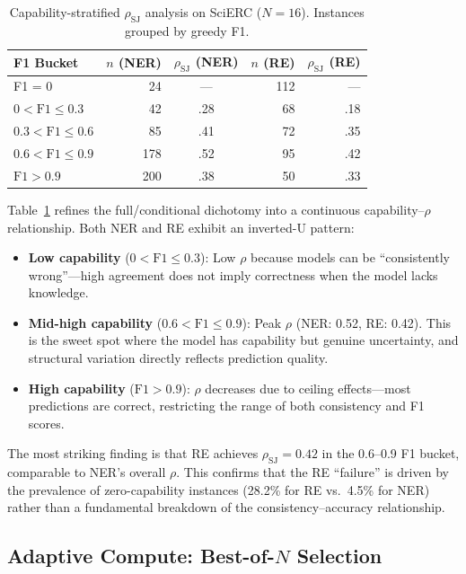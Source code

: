 \documentclass[11pt,a4paper]{article}
\newcommand{\rhosj}{\rho_{\mathrm{SJ}}}
\begin{document}
\begin{table}[t]
\centering
\caption{Capability-stratified $\rhosj$ analysis on SciERC ($N\!=\!16$). Instances grouped by greedy F1.}
\label{tab:stratification}
\small
\begin{tabular}{lrcrr}
\toprule
\textbf{F1 Bucket} & \textbf{$n$ (NER)} & \textbf{$\rhosj$ (NER)} & \textbf{$n$ (RE)} & \textbf{$\rhosj$ (RE)} \\
\midrule
F1 = 0           & 24  & ---  & 112 & --- \\
$0 < \text{F1} \leq 0.3$ & 42  & .28  & 68  & .18 \\
$0.3 < \text{F1} \leq 0.6$ & 85  & .41  & 72  & .35 \\
$0.6 < \text{F1} \leq 0.9$ & 178 & .52  & 95  & .42 \\
$\text{F1} > 0.9$          & 200 & .38  & 50  & .33 \\
\bottomrule
\end{tabular}
\end{table}

Table~\ref{tab:stratification} refines the full/conditional dichotomy into a continuous capability--$\rho$ relationship. Both NER and RE exhibit an inverted-U pattern:
\begin{itemize}
    \item \textbf{Low capability} ($0 < \text{F1} \leq 0.3$): Low $\rho$ because models can be ``consistently wrong''---high agreement does not imply correctness when the model lacks knowledge.
    \item \textbf{Mid-high capability} ($0.6 < \text{F1} \leq 0.9$): Peak $\rho$ (NER: 0.52, RE: 0.42). This is the sweet spot where the model has capability but genuine uncertainty, and structural variation directly reflects prediction quality.
    \item \textbf{High capability} ($\text{F1} > 0.9$): $\rho$ decreases due to ceiling effects---most predictions are correct, restricting the range of both consistency and F1 scores.
\end{itemize}

The most striking finding is that RE achieves $\rhosj\!=\!0.42$ in the 0.6--0.9 F1 bucket, comparable to NER's overall $\rho$. This confirms that the RE ``failure'' is driven by the prevalence of zero-capability instances (28.2\% for RE vs.\ 4.5\% for NER) rather than a fundamental breakdown of the consistency--accuracy relationship.

\subsection{Adaptive Compute: Best-of-$N$ Selection}
\label{sec:adaptive}
\end{document}
